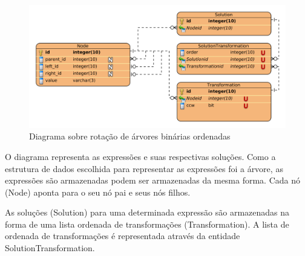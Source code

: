 \begin{figure}[H]
	\caption{\label{gram_cls}Diagrama sobre rotação de árvores binárias ordenadas}
	\begin{center}
	    \includegraphics[scale=0.5]{datamodel.png}
	\end{center}
\end{figure}

O diagrama representa as expressões e suas respectivas soluções. Como a estrutura de dados escolhida para representar as expressões foi a árvore, as expressões são armazenadas podem ser armazenadas da mesma forma. Cada nó (Node) aponta para o seu nó pai e seus nós filhos.

As soluções (Solution) para uma determinada expressão são armazenadas na forma de uma lista ordenada de transformações (Transformation). A lista de ordenada de transformações é representada através da entidade SolutionTransformation.
